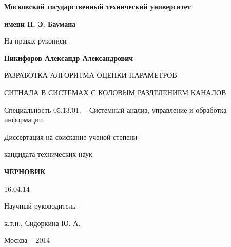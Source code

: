 \noindent\centerline{\bf{Московский государственный технический университет}}
\noindent\centerline{\bf{имени Н. Э. Баумана}}
\vspace{\baselineskip}
\vspace{\baselineskip}

\hfill На правах рукописи

\vspace{\baselineskip}
\vspace{\baselineskip}

\noindent\centerline{\bf{Никифоров Александр Александрович}}

\vspace{\baselineskip}
\vspace{\baselineskip}

\noindent\centerline{РАЗРАБОТКА АЛГОРИТМА ОЦЕНКИ ПАРАМЕТРОВ}
\noindent\centerline{СИГНАЛА В СИСТЕМАХ С КОДОВЫМ РАЗДЕЛЕНИЕМ КАНАЛОВ}

\vspace{\baselineskip}
\vspace{\baselineskip}

\noindent\centerline{Специальность 05.13.01. – Системный анализ, управление и обработка информации}

\vspace{\baselineskip}
\vspace{\baselineskip}

\noindent\centerline{Диссертация на соискание ученой степени}
\noindent\centerline{кандидата технических наук}


\vspace{\baselineskip}
\vspace{\baselineskip}
\noindent\centerline{\bf{ЧЕРНОВИК}}
\noindent\centerline{16.04.14}

\vspace{\baselineskip}
\vspace{\baselineskip}

\hfill{Научный руководитель -}

\hfill{к.т.н., Сидоркина Ю. А.}

\vfill
\noindent\centerline{Москва – 2014}

\newpage
